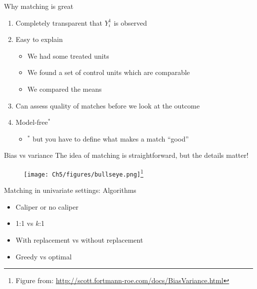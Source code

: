 \documentclass{beamer}
\begin{document}
\begin{frame}{Why matching is great} \pause

\begin{enumerate}[<+->]
\item Completely transparent that $Y_i^1$ is observed
\item Easy to explain
\begin{itemize}
\item We had some treated units
\item We found a set of control units which are comparable
\item We compared the means
\end{itemize}
\item Can assess quality of matches before we look at the outcome
\item Model-free${}^*$
\begin{itemize}
\item ${}^*$ but you have to define what makes a match ``good''
\end{itemize}
\end{enumerate}

\end{frame}



\begin{frame}{Bias vs variance}
The idea of matching is straightforward, but the details matter!
\pause
\begin{figure}
    \centering
    \texttt{[image: Ch5/figures/bullseye.png]}\footnote{Figure from: \url{http://scott.fortmann-roe.com/docs/BiasVariance.html}}
\end{figure}

\end{frame}

\begin{frame}{Matching in univariate settings: Algorithms}

\begin{itemize}
\item Caliper or no caliper
\item 1:1 vs $k$:1
\item With replacement vs without replacement
\item Greedy vs optimal
\end{itemize}

\end{frame}
\end{document}
